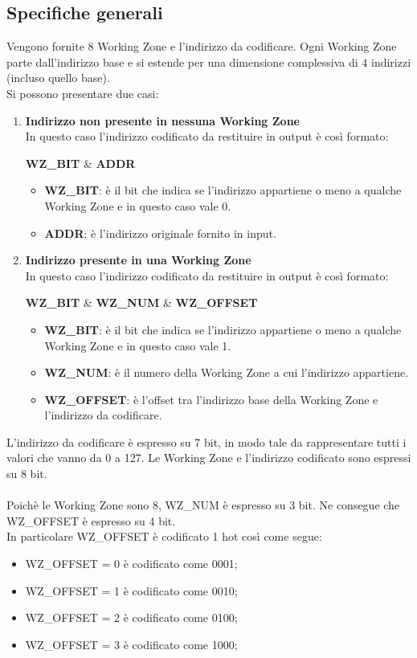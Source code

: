 \documentclass{article}
\begin{document}
\subsection{Specifiche generali}
Vengono fornite 8 Working Zone e l'indirizzo da codificare. Ogni Working Zone parte dall'indirizzo base e si estende per una dimensione complessiva di 4 indirizzi (incluso quello base).\\Si possono presentare due casi:
\begin{enumerate}
\item\textbf{Indirizzo non presente in nessuna Working Zone}\\
In questo caso l'indirizzo codificato da restituire in output è così formato:
\begin{center}
\textbf{WZ\_BIT} \& \textbf{ADDR}
\end{center}
\begin{itemize}
\item\textbf{WZ\_BIT}: è il bit che indica se l'indirizzo appartiene o meno a qualche Working Zone e in questo caso vale 0.
\item\textbf{ADDR}: è l'indirizzo originale fornito in input.
\end{itemize}
\item\textbf{Indirizzo presente in una Working Zone}\\
In questo caso l'indirizzo codificato da restituire in output è così formato:
\begin{center}
\textbf{WZ\_BIT} \& \textbf{WZ\_NUM} \& \textbf{WZ\_OFFSET}
\end{center}
\begin{itemize}
\item\textbf{WZ\_BIT}: è il bit che indica se l'indirizzo appartiene o meno a qualche Working Zone e in questo caso vale 1.
\item\textbf{WZ\_NUM}: è il numero della Working Zone a cui l'indirizzo appartiene.
\item\textbf{WZ\_OFFSET}: è l'offset tra l'indirizzo base della Working Zone e l'indirizzo da codificare.
\end{itemize}
\end{enumerate}
L'indirizzo da codificare è espresso su 7 bit, in modo tale da rappresentare tutti i valori che vanno da 0 a 127. Le Working Zone e l'indirizzo codificato sono espressi su 8 bit.\\\\
Poichè le Working Zone sono 8, WZ\_NUM è espresso su 3 bit. Ne consegue che WZ\_OFFSET è espresso su 4 bit.\\
In particolare WZ\_OFFSET è codificato 1 hot così come segue:
\begin{itemize}
\item WZ\_OFFSET = 0 è codificato come 0001;
\item WZ\_OFFSET = 1 è codificato come 0010;
\item WZ\_OFFSET = 2 è codificato come 0100;
\item WZ\_OFFSET = 3 è codificato come 1000;
\end{itemize}
\end{document}
